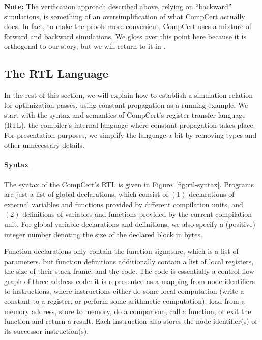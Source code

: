 \textbf{Note:} The verification approach described above, relying on ``backward'' simulations, is
something of an oversimplification of what CompCert actually does.  In fact, to make the proofs more
convenient, CompCert uses a mixture of forward and backward simulations.  We gloss over this point
here because it is orthogonal to our story, but we will return to it in .




\subsection{The RTL Language}
\label{sec:background:rtl}


In the rest of this section, we will explain how to establish a simulation relation for optimization
passes, using constant propagation as a running example.  We start with the syntax and semantics of
CompCert's register transfer language (RTL), the compiler's internal language where constant
propagation takes place.  For presentation purposes, we simplify the language a bit by removing
types and other unnecessary details.


\paragraph{Syntax}



The syntax of the CompCert's RTL is given in Figure~\ref{fig:rtl-syntax}.  Programs are just a list
of global declarations, which consist of $(1)$ declarations of external variables and functions
provided by different compilation units, and $(2)$ definitions of variables and functions provided
by the current compilation unit.  For global variable declarations and definitions, we also specify
a (positive) integer number denoting the size of the declared block in bytes.

Function declarations only contain the function signature, which is a list of parameters, but
function definitions additionally contain a list of local registers, the size of their stack frame,
and the code.  The code is essentially a control-flow graph of three-address code: it is represented
as a mapping from node identifiers to instructions, where instructions either
%
do some local computation (\eg write a constant to a register, or perform some arithmetic
computation),
%
load from a memory address, 
%
store to memory,
%
do a comparison,
%
call a function, 
%
or exit the function and return a result. 
%
Each instruction also stores the node identifier(s) of its successor instruction(s).

